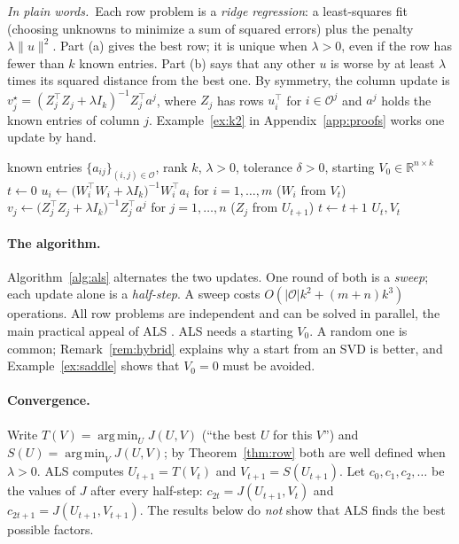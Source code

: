 \documentclass[10pt]{article}
\theoremstyle{plain}
\theoremstyle{definition}
\theoremstyle{remark}
\newcommand{\R}{\mathbb{R}}
\newcommand{\T}{^{\top}}
\newcommand{\norm}[1]{\lVert #1\rVert}
\newcommand{\obs}{\mathcal{O}}
\DeclareMathOperator*{\argmin}{arg\,min}
\newcommand{\plain}{\noindent\emph{In plain words.}\ }
\begin{document}
\plain Each row problem is a \emph{ridge regression}: a least-squares fit (choosing unknowns to minimize a sum of squared errors) plus the penalty $\lambda\norm u^2$. Part (a) gives the best row; it is unique when $\lambda>0$, even if the row has fewer than $k$ known entries. Part (b) says that any other $u$ is worse by at least $\lambda$ times its squared distance from the best one. By symmetry, the column update is $v_j^\star=(Z_j\T Z_j+\lambda I_k)^{-1}Z_j\T a^j$, where $Z_j$ has rows $u_i\T$ for $i\in\obs^j$ and $a^j$ holds the known entries of column $j$. Example~\ref{ex:k2} in Appendix~\ref{app:proofs} works one update by hand.

\begin{algorithm}[!tb]
\caption{Alternating least squares (ALS) for the objective~\eqref{eq:J}}\label{alg:als}
\begin{algorithmic}[1]
\Require known entries $\{a_{ij}\}_{(i,j)\in\obs}$, rank $k$, $\lambda>0$, tolerance $\delta>0$, starting $V_0\in\R^{n\times k}$
\State $t\gets0$
\Repeat
  \State $u_i\gets\bigl(W_i\T W_i+\lambda I_k\bigr)^{-1}W_i\T a_i$ for $i=1,\dots,m$ ($W_i$ from $V_t$) 
  \State $v_j\gets\bigl(Z_j\T Z_j+\lambda I_k\bigr)^{-1}Z_j\T a^j$ for $j=1,\dots,n$ ($Z_j$ from $U_{t+1}$) 
  \State $t\gets t+1$
\State \Return $U_t,V_t$
\end{algorithmic}
\end{algorithm}

\paragraph{The algorithm.}
Algorithm~\ref{alg:als} alternates the two updates. One round of both is a \emph{sweep}; each update alone is a \emph{half-step}. A sweep costs $O(|\obs|k^2+(m+n)k^3)$ operations. All row problems are independent and can be solved in parallel, the main practical appeal of ALS \cite{zhou2008}. ALS needs a starting $V_0$. A random one is common; Remark~\ref{rem:hybrid} explains why a start from an SVD is better, and Example~\ref{ex:saddle} shows that $V_0=0$ must be avoided.

\paragraph{Convergence.}
Write $T(V)=\argmin_UJ(U,V)$ (``the best $U$ for this $V$'') and $S(U)=\argmin_VJ(U,V)$; by Theorem~\ref{thm:row} both are well defined when $\lambda>0$. ALS computes $U_{t+1}=T(V_t)$ and $V_{t+1}=S(U_{t+1})$. Let $c_0,c_1,c_2,\dots$ be the values of $J$ after every half-step: $c_{2t}=J(U_{t+1},V_t)$ and $c_{2t+1}=J(U_{t+1},V_{t+1})$. The results below do \emph{not} show that ALS finds the best possible factors.
\end{document}
